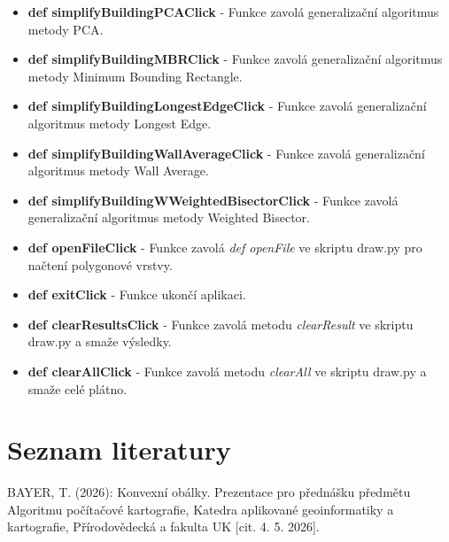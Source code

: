 \documentclass[12pt, a4paper]{article}
\begin{document}
\begin{itemize}
    \item \textbf{def simplifyBuildingPCAClick} - Funkce zavolá generalizační algoritmus metody PCA.
    \item \textbf{def simplifyBuildingMBRClick} - Funkce zavolá generalizační algoritmus metody Minimum Bounding Rectangle.
    \item \textbf{def simplifyBuildingLongestEdgeClick} - Funkce zavolá generalizační algoritmus metody Longest Edge.
    \item \textbf{def simplifyBuildingWallAverageClick} -  Funkce zavolá generalizační algoritmus metody Wall Average.
    \item \textbf{def simplifyBuildingWWeightedBisectorClick} -  Funkce zavolá generalizační algoritmus metody Weighted Bisector.
    \item \textbf{def openFileClick} - Funkce zavolá \textit{def openFile} ve skriptu draw.py pro načtení polygonové vrstvy.
    \item \textbf{def exitClick} - Funkce ukončí aplikaci.
    \item \textbf{def clearResultsClick} - Funkce zavolá metodu \textit{clearResult} ve skriptu draw.py a smaže výsledky.
    \item \textbf{def clearAllClick} - Funkce zavolá metodu \textit{clearAll} ve skriptu draw.py a smaže celé plátno.
\end{itemize}

\newpage
\section*{Seznam literatury}
\vspace{5mm}
\noindent BAYER, T. (2026): Konvexní obálky. Prezentace pro přednášku předmětu Algoritmu počítačové kartografie, Katedra aplikované geoinformatiky  a kartografie, Přírodovědecká a fakulta UK [cit. 4. 5. 2026].
\vspace{3mm}
\end{document}
